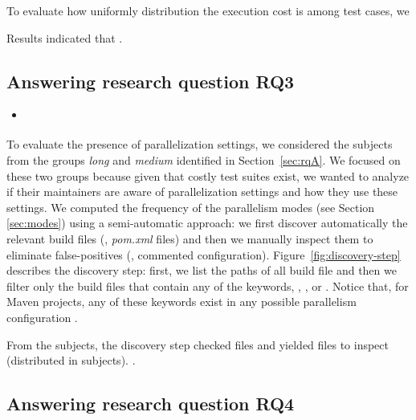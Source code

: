 To evaluate how uniformly distribution the execution cost is among
test cases, we  

Results indicated that . 

\subsection{Answering research question RQ3}
\label{sec:rqC}

\begin{itemize}
    \item \emph{\RQC}
\end{itemize}

To evaluate the presence of parallelization settings, we considered
the \numSubjsRqTwo{} subjects from the groups \emph{long} and
\emph{medium} identified in Section~\ref{sec:rqA}. We focused on
these two groups because given that costly test suites exist, we
wanted to analyze if their maintainers are aware of parallelization
settings and how they use these settings.  We computed the
frequency of the parallelism modes (see Section \ref{sec:modes}) using
a semi-automatic approach: we first discover automatically the
relevant build files (\ie, \emph{pom.xml} files) and then we manually
inspect them to eliminate false-positives (\eg, commented
configuration).  Figure~\ref{fig:discovery-step} describes the
discovery step: first, we list the paths of all build file and then we
filter only the build files that contain any of the keywords,
, , or . Notice
that, for Maven projects, any of these keywords exist in any possible
parallelism configuration .



From the \numSubjsRqTwo{} subjects, the discovery step checked 
files and yielded  files to inspect (distributed in 
subjects). 
.

\subsection{Answering research question RQ4}
\label{sec:rqD}

